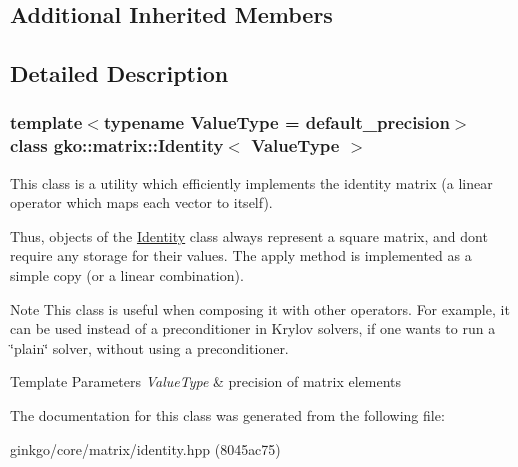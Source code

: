 \subsection*{Additional Inherited Members}


\subsection{Detailed Description}
\subsubsection*{template$<$typename Value\+Type = default\+\_\+precision$>$\newline
class gko\+::matrix\+::\+Identity$<$ Value\+Type $>$}

This class is a utility which efficiently implements the identity matrix (a linear operator which maps each vector to itself). 

Thus, objects of the \hyperlink{classgko_1_1matrix_1_1Identity}{Identity} class always represent a square matrix, and don\textquotesingle{}t require any storage for their values. The apply method is implemented as a simple copy (or a linear combination).

\begin{DoxyNote}{Note}
This class is useful when composing it with other operators. For example, it can be used instead of a preconditioner in Krylov solvers, if one wants to run a \char`\"{}plain\char`\"{} solver, without using a preconditioner.
\end{DoxyNote}

\begin{DoxyTemplParams}{Template Parameters}
{\em Value\+Type} & precision of matrix elements \\
\hline
\end{DoxyTemplParams}


The documentation for this class was generated from the following file\+:\begin{DoxyCompactItemize}
\item 
ginkgo/core/matrix/identity.\+hpp (8045ac75)\end{DoxyCompactItemize}
